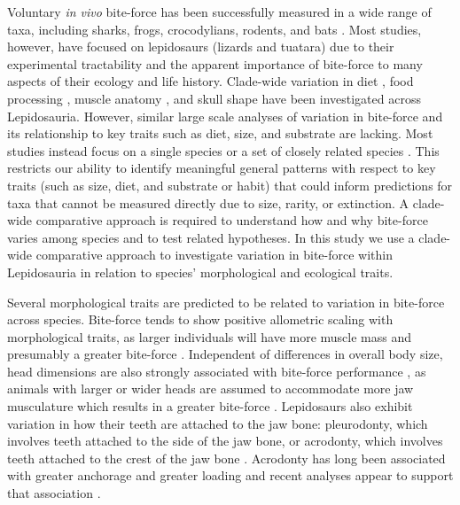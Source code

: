 \documentclass[a4paper, 12pt]{article}
\begin{document}
Voluntary \textit{in vivo} bite-force has been successfully measured in a wide range of taxa, including sharks, frogs, crocodylians, rodents, and bats \citep{dessem1992jaw,herrel1999morphology,huber2005analysis,santana2010mechanics,erickson2014comparative,becerra2013biting,lappin2014reliable,lappin2017bite}. 
Most studies, however, have focused on lepidosaurs (lizards and tuatara) due to their experimental tractability and the apparent importance of bite-force to many aspects of their ecology and life history. 
Clade-wide variation in diet \citep[e.g.][]{cooper2002distribution,meiri2018traits}, food processing \citep[e.g.][]{mcbrayer2002prey,vitt2003history}, muscle anatomy \citep[e.g.][]{haas1973muscles,daza2011jaw}, and skull shape \citep[e.g.][]{metzger2005correlations} have been investigated across Lepidosauria. 
However, similar large scale analyses of variation in bite-force and its relationship to key traits such as diet, size, and substrate are lacking. Most studies instead focus on a single species \citep[e.g.][]{lappin2006gapingA,jones2020reproductive} or a set of closely related species \citep[e.g.][]{d2018increasing,taverne2020proximate}. 
This restricts our ability to identify meaningful general patterns with respect to key traits (such as size, diet, and substrate or habit) that could inform predictions for taxa that cannot be measured directly due to size, rarity, or extinction. 
A clade-wide comparative approach is required to understand how and why bite-force varies among species and to test related hypotheses.
In this study we use a clade-wide comparative approach to investigate variation in bite-force within Lepidosauria in relation to species' morphological and ecological traits. 

Several morphological traits are predicted to be related to variation in bite-force across species. Bite-force tends to show positive allometric scaling with morphological traits, as larger individuals will have more muscle mass and presumably a greater bite-force \citep{aguirre2002ecomorphological,lailvaux2004performance,MEASEY2009217,herrel2004omnivory,vanhooydonck2005does}.
Independent of differences in overall body size, head dimensions are also strongly associated with bite-force performance \citep{jones2020reproductive,kaliontzopoulou2012relationships}, as animals with larger or wider heads are assumed to accommodate more jaw musculature which results in a greater bite-force \citep{herrel1999morphology,huyghe2005morphology,lappin2006biteB}.
Lepidosaurs also exhibit variation in how their teeth are attached to the jaw bone: pleurodonty, which involves teeth attached to the side of the jaw bone, or acrodonty, which involves teeth attached to the crest of the jaw bone \citep{smith1958evolutionary}.
Acrodonty has long been associated with greater anchorage and greater loading \citep[e.g][]{smith1958evolutionary,jones2008skull,fraser1983ecology,whiteside1986head} and recent analyses appear to support that association \citep{jenkins2020bite}.
\end{document}
